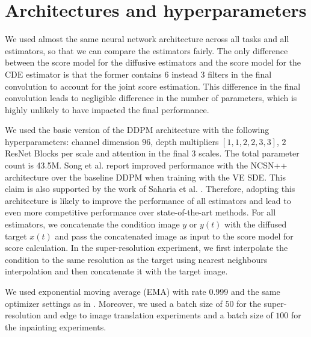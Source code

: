 \section{Architectures and hyperparameters}
\label{ch2:appendix:hyperparams}
We used almost the same neural network architecture across all tasks and all estimators, so that we can compare the estimators fairly. The only difference between the score model for the diffusive estimators and the score model for the CDE estimator is that the former contains $6$ instead $3$ filters in the final convolution to account for the joint score estimation. This difference in the final convolution leads to negligible difference in the number of parameters, which is highly unlikely to have impacted the final performance. 

We used the basic version of the DDPM architecture with the following hyperparameters: channel dimension $96$, depth multipliers $[1, 1, 2, 2, 3, 3]$, $2$ ResNet Blocks per scale and attention in the final $3$ scales. The total parameter count is 43.5M. Song et al. \cite{song2021sde} report improved performance with the NCSN++ architecture over the baseline DDPM when training with the VE SDE. This claim is also supported by the work of Saharia et al. \cite{saharia2021sr3}. Therefore, adopting this architecture is likely to improve the performance of all estimators and lead to even more competitive performance over state-of-the-art methods. For all estimators, we concatenate the condition image $y$ or $y(t)$ with the diffused target $x(t)$ and pass the concatenated image as input to the score model for score calculation. In the super-resolution experiment, we first interpolate the condition to the same resolution as the target using nearest neighbours interpolation and then concatenate it with the target image. 

We used exponential moving average (EMA) with rate 0.999 and the same optimizer settings as in \cite{song2021sde}. Moreover, we used a batch size of $50$ for the super-resolution and edge to image translation experiments and a batch size of $100$ for the inpainting experiments. 


